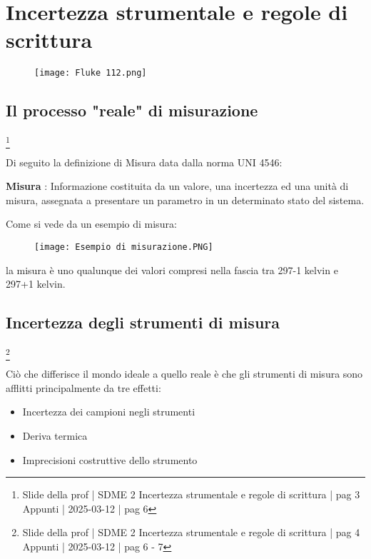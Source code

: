 \chapter{Incertezza strumentale e regole di scrittura}

\begin{figure}[h]
    \centering
    \texttt{[image: Fluke 112.png]}
\end{figure}

\newpage 

\section{Il processo "reale" di misurazione}
\footnote{Slide della prof | SDME 2 Incertezza strumentale e regole di scrittura | pag 3 \\  
Appunti | 2025-03-12 | pag 6}

Di seguito la definizione di Misura data dalla norma UNI 4546: \newline

\textbf{Misura} : Informazione costituita da un valore, una incertezza ed una unità di misura, 
assegnata a presentare un parametro in un determinato stato del sistema. \newline 

Come si vede da un esempio di misura: 

\begin{figure}[h]
    \centering
    \texttt{[image: Esempio di misurazione.PNG]}
\end{figure}

la misura è uno qualunque dei valori compresi nella fascia tra 297-1 kelvin e 297+1 kelvin. \newline 

\newpage 

\section{Incertezza degli strumenti di misura}
\footnote{Slide della prof | SDME 2 Incertezza strumentale e regole di scrittura | pag 4 \\  
Appunti | 2025-03-12 | pag 6 - 7}

Ciò che differisce il mondo ideale a quello reale è che 
gli strumenti di misura sono afflitti principalmente da tre effetti: 

\begin{itemize}
    \item Incertezza dei campioni negli strumenti 
    \item Deriva termica 
    \item Imprecisioni costruttive dello strumento 
\end{itemize}

